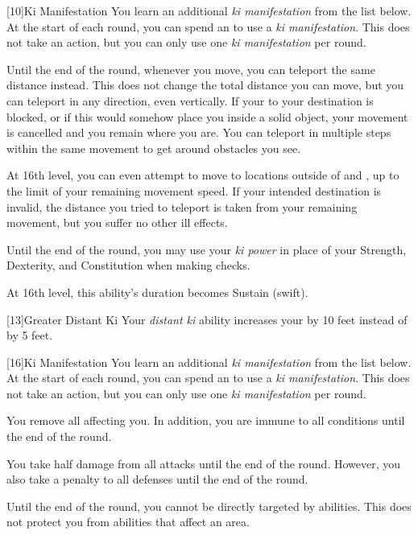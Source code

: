         [10]{Ki Manifestation}
        You learn an additional \textit{ki manifestation} from the list below.
        At the start of each round, you can spend an  to use a \textit{ki manifestation}.
        This does not take an action, but you can only use one \textit{ki manifestation} per round.
        {

            Until the end of the round, whenever you move, you can teleport the same distance instead.
            This does not change the total distance you can move, but you can teleport in any direction, even vertically.
            If your  to your destination is blocked, or if this would somehow place you inside a solid object, your movement is cancelled and you remain where you are.
            You can teleport in multiple steps within the same movement to get around obstacles you see.

            At 16th level, you can even attempt to move to locations outside of  and , up to the limit of your remaining movement speed.
            If your intended destination is invalid, the distance you tried to teleport is taken from your remaining movement, but you suffer no other ill effects.

            Until the end of the round, you may use your \textit{ki power} in place of your Strength, Dexterity, and Constitution when making checks.

            At 16th level, this ability's duration becomes Sustain (swift).
        }

        [13]{Greater Distant Ki} Your \textit{distant ki} ability increases your  by 10 feet instead of by 5 feet.

        [16]{Ki Manifestation}
        You learn an additional \textit{ki manifestation} from the list below.
        At the start of each round, you can spend an  to use a \textit{ki manifestation}.
        This does not take an action, but you can only use one \textit{ki manifestation} per round.
        {
             You remove all  affecting you.
            In addition, you are immune to all conditions until the end of the round.

             You take half damage from all attacks until the end of the round.
            However, you also take a  penalty to all defenses until the end of the round.

             Until the end of the round, you cannot be directly targeted by  abilities.
            This does not protect you from abilities that affect an area.
        }

